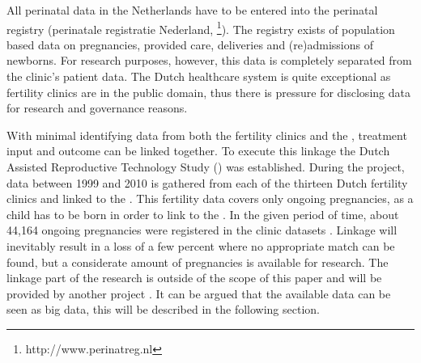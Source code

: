 All perinatal data in the Netherlands have to be entered into the perinatal registry (perinatale registratie Nederland, \PRN{}\footnote{http://www.perinatreg.nl}).
The registry exists of population based data on pregnancies, provided care, deliveries and (re)admissions of newborns.
For research purposes, however, this data is completely separated from the clinic's patient data.
The Dutch healthcare system is quite exceptional as fertility clinics are in the public domain, thus there is pressure for disclosing  data for research and governance reasons.

With minimal identifying data from both the fertility clinics and the \PRN{}, treatment input and outcome can be linked together.
To execute this linkage the Dutch Assisted Reproductive Technology Study (\project{}) was established.
During the project, data between 1999 and 2010 is gathered from each of the thirteen Dutch fertility clinics and linked to the \PRN{}.
This fertility data covers only ongoing pregnancies, as a child has to be born in order to link to the \PRN{}.
In the given period of time, about 44,164 ongoing pregnancies were registered in the clinic datasets \cite{ivfReportNVOG}.
Linkage will inevitably result in a loss of a few percent where no appropriate match can be found, 
but a considerate amount of pregnancies is available for research.
The linkage part of the research is outside of the scope of this paper and will be provided by another project \cite{}.
It can be argued that the available data can be seen as big data, this will be described in the following section.